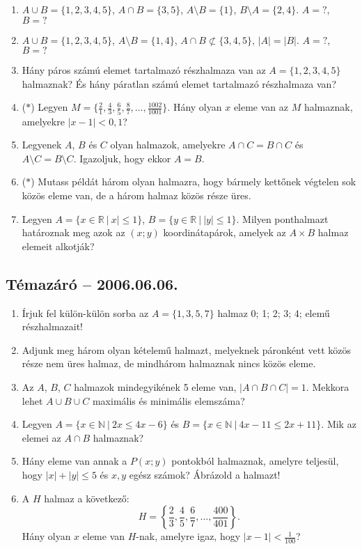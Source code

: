 \begin{enumerate}
\item $A\cup B=\{1,2,3,4,5\}$, $A\cap B=\{3,5\}$, $A\setminus B=\{1\}$,
$B\setminus A=\{2,4\}$. $A=?$, $B=?$
\item $A\cup B=\{1,2,3,4,5\}$, $A\setminus B=\{1,4\}$, $A\cap B\not\subset\{3,4,5\}$, $|A|=|B|$. $A=?$, $B=?$
\item Hány páros számú elemet tartalmazó részhalmaza van az $A=\{1,2,3,4,5\}$ halmaznak? És hány páratlan számú elemet tartalmazó részhalmaza van?
\item ($*$) Legyen $M=\{\frac{2}{1},\frac{4}{3},\frac{6}{5},\frac{8}{7},\ldots,\frac{1002}{1001}\}$. Hány olyan $x$ eleme van az $M$ halmaznak, amelyekre $|x-1|<0{,}1$?
\item Legyenek $A$, $B$ és $C$ olyan halmazok, amelyekre $A\cap C = B\cap C$ és
$A\setminus C=B\setminus C$. Igazoljuk, hogy ekkor $A=B$.
\item ($*$) Mutass példát három olyan halmazra, hogy bármely kettőnek végtelen sok közös eleme van, de a három halmaz közös része üres.
\item Legyen $A=\{x\in \mathbb{R}~|~x|\le 1\}$, $B=\{y\in \mathbb{R}~|~|y|\le 1\}$.
Milyen ponthalmazt határoznak meg azok az $(x;y)$ koordinátapárok, amelyek az $A\times B$ halmaz elemeit alkotják?
\end{enumerate}

\subsection*{Témazáró -- 2006.06.06.}

\begin{enumerate}
\item Írjuk fel külön-külön sorba az $A=\{1,3,5,7\}$ halmaz 0; 1; 2; 3; 4; elemű részhalmazait!
\item Adjunk meg három olyan kételemű halmazt, melyeknek páronként vett közös része nem üres halmaz, de mindhárom halmaznak nincs közös eleme.
\item Az $A$, $B$, $C$ halmazok mindegyikének 5 eleme van, $|A\cap B \cap C|=1$.
Mekkora lehet $A\cup B \cup C$ maximális és minimális elemszáma?
\item Legyen $A=\{x\in\mathbb{N} ~|~ 2x\le 4x-6\}$ és $B=\{x\in\mathbb{N}~|~4x-11\le 2x+11\}$. Mik az elemei az $A\cap B$ halmaznak?
\item Hány eleme van annak a $P(x;y)$ pontokból halmaznak, amelyre teljesül, hogy $|x|+|y|\le 5$ és $x,y$ egész számok? Ábrázold a halmazt!
\item A $H$ halmaz a következő:
$$H=\left\{\frac{2}{3},\frac{4}{5},\frac{6}{7},\ldots,\frac{400}{401}\right\}.$$
Hány olyan $x$ eleme van $H$-nak, amelyre igaz, hogy $|x-1|<\frac{1}{100}$?
\end{enumerate}



